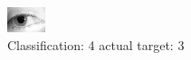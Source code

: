 \begin{figure}[h!]
\begin{center}
\includegraphics[width=0.60\columnwidth]{figures/ID1267_class_4_target_3.png}
\end{center}
\caption{ Classification: 4 actual target: 3}
\label{fig:ID1267_class_4_target_3}
\end{figure}
